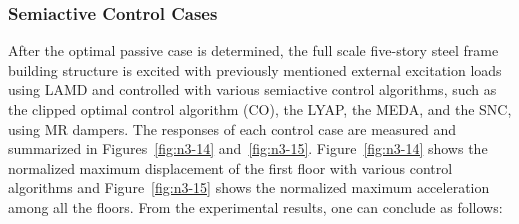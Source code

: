\subsubsection{Semiactive Control Cases}

After the optimal passive case is determined, the full scale five-story steel frame building structure is excited with previously mentioned external excitation loads using LAMD and controlled with various semiactive control algorithms, such as the clipped optimal control algorithm (CO), the LYAP, the MEDA, and the SNC, using MR dampers. The responses of each control case are measured and summarized in Figures~\ref{fig:n3-14} and~\ref{fig:n3-15}. Figure~\ref{fig:n3-14} shows the normalized maximum displacement of the first floor with various control algorithms and Figure~\ref{fig:n3-15} shows the normalized maximum acceleration among all the floors. From the experimental results, one can conclude as follows:

